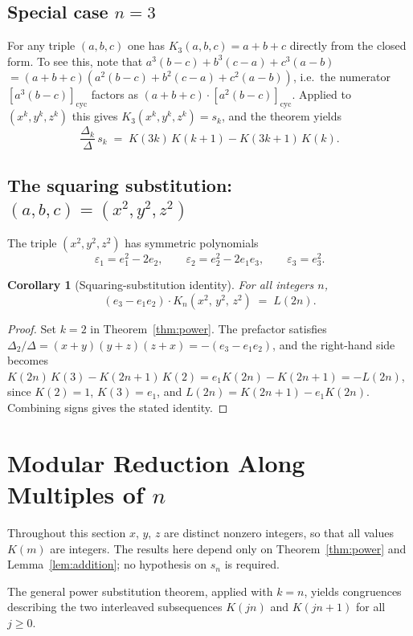 \documentclass[12pt]{article}
\newtheorem{corollary}[theorem]{Corollary}
\theoremstyle{definition}
\newcommand{\cyc}[1]{\left[#1\right]_{\!\mathrm{cyc}}}
\begin{document}
	\subsection*{Special case $n=3$}
	
	For any triple $(a,b,c)$ one has $K_3(a,b,c) = a+b+c$ directly from the
	closed form.  To see this, note that $a^3(b-c) + b^3(c-a) + c^3(a-b)$
	$= (a+b+c)(a^2(b-c)+b^2(c-a)+c^2(a-b))$, i.e.\ the numerator $\cyc{a^3(b-c)}$ factors as
	$(a+b+c)\cdot\cyc{a^2(b-c)}$.  Applied to $(x^k,y^k,z^k)$ this gives
	$K_3(x^k,y^k,z^k) = s_k$, and the theorem yields
	\[
	\frac{\Delta_k}{\Delta}\, s_k
	\;=\;
	K(3k)\,K(k+1) - K(3k+1)\,K(k).
	\]
	
	\subsection{The squaring substitution: $(a,b,c) = (x^2, y^2, z^2)$}
	
	The triple $(x^2,y^2,z^2)$ has symmetric polynomials
	\[
	\varepsilon_1 = e_1^2-2e_2, \qquad \varepsilon_2 = e_2^2-2e_1e_3, \qquad \varepsilon_3 = e_3^2.
	\]
	
	\begin{corollary}[Squaring-substitution identity]
		\label{thm:squaring}
		For all integers $n$,
		\[
		(e_3 - e_1 e_2)\cdot K_n(x^2,\,y^2,\,z^2) \;=\; L(2n).
		\]
	\end{corollary}
	\begin{proof}
		Set $k=2$ in Theorem~\ref{thm:power}.  The prefactor satisfies
		$\Delta_2/\Delta = (x+y)(y+z)(z+x) = -(e_3-e_1e_2)$, and the
		right-hand side becomes
		$K(2n)\,K(3) - K(2n+1)\,K(2) = e_1 K(2n) - K(2n+1) = -L(2n)$,
		since $K(2)=1$, $K(3)=e_1$, and $L(2n) = K(2n+1)-e_1 K(2n)$.
		Combining signs gives the stated identity.
	\end{proof}
	
	\section{Modular Reduction Along Multiples of $n$}
	\label{sec:modular-reduction}
	
	Throughout this section $x$, $y$, $z$ are distinct nonzero integers, so
	that all values $K(m)$ are integers.  The results here depend only on
	Theorem~\ref{thm:power} and Lemma~\ref{lem:addition}; no hypothesis on
	$s_n$ is required.
	
	The general power substitution theorem, applied with $k = n$, yields
	congruences describing the two interleaved subsequences $K(jn)$ and
	$K(jn+1)$ for all $j \geq 0$.
	
\end{document}
